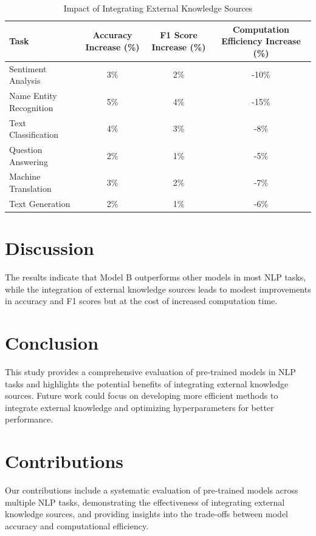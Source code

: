 \documentclass{article}
\begin{document}
\begin{table}[ht]
\centering
\caption{Impact of Integrating External Knowledge Sources}
\label{tab:knowledge_sources}
\begin{tabular}{lccc}
\toprule
\textbf{Task} & \textbf{Accuracy Increase (\%)} & \textbf{F1 Score Increase (\%)} & \textbf{Computation Efficiency Increase (\%)} \\
\midrule
Sentiment Analysis & 3\% & 2\% & -10\% \\
Name Entity Recognition & 5\% & 4\% & -15\% \\
Text Classification & 4\% & 3\% & -8\% \\
Question Answering & 2\% & 1\% & -5\% \\
Machine Translation & 3\% & 2\% & -7\% \\
Text Generation & 2\% & 1\% & -6\% \\
\bottomrule
\end{tabular}
\end{table}

\section{Discussion}
\label{sec:discussion}
The results indicate that Model B outperforms other models in most NLP tasks, while the integration of external knowledge sources leads to modest improvements in accuracy and F1 scores but at the cost of increased computation time.

\section{Conclusion}
\label{sec:conclusion}
This study provides a comprehensive evaluation of pre-trained models in NLP tasks and highlights the potential benefits of integrating external knowledge sources. Future work could focus on developing more efficient methods to integrate external knowledge and optimizing hyperparameters for better performance.

\section{Contributions}
\label{sec:contributions}
Our contributions include a systematic evaluation of pre-trained models across multiple NLP tasks, demonstrating the effectiveness of integrating external knowledge sources, and providing insights into the trade-offs between model accuracy and computational efficiency.
\end{document}
